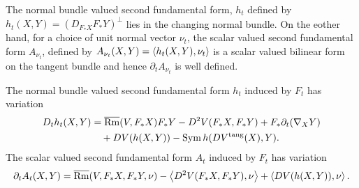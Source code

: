 The normal bundle valued second fundamental form, \(h_t\) defined by \(h_t(X, Y) = (D_{F_{\ast} X} F_{\ast} Y)^{\perp}\) lies in the changing normal bundle. On the eother hand, for a choice of unit normal vector \(\nu_t\), the scalar valued second fundamental form \(A_{\nu_t}\), defined by \(A_{\nu_t} (X, Y) = \left\langle h_t(X, Y),\nu_t \right\rangle\) is a scalar valued bilinear form on the tangent bundle and hence \(\partial_t A_{\nu_t}\) is well defined.

\begin{lemma}
The normal bundle valued second fundamental form \(h_t\) induced by \(F_t\) has variation
\[
\begin{split}
D_t h_t (X, Y) &= \overline{\operatorname{Rm}} (V, F_{\ast} X) F_{\ast} Y - D^2 V(F_{\ast} X, F_{\ast} Y) + F_{\ast} \partial_t (\nabla_X Y) \\
&\quad + DV (h(X, Y)) - \operatorname{Sym} h(DV^{\operatorname{tang}}(X), Y).
\end{split}
\]
The scalar valued second fundamental form \(A_t\) induced by \(F_t\) has variation
\[
\partial_t A_t(X, Y) = \overline{\operatorname{Rm}} (V, F_{\ast} X, F_{\ast} Y, \nu) - \left\langle D^2 V(F_{\ast} X, F_{\ast} Y),\nu \right\rangle + \left\langle DV (h(X, Y)),\nu \right\rangle.
\]
\end{lemma}

